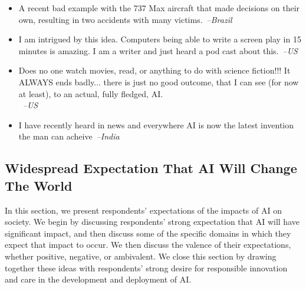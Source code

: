 \documentclass[sigconf]{acmart}
\newcommand\aff[1]{\textcolor{darkplum}{{\emph{--#1}}}}
\newenvironment{lq2}
{ \begin{itemize}[leftmargin = 2.0em, rightmargin=1.0em, label={}]
    \fontsize{8.3pt}{8.9pt}\selectfont
\setlength{\itemsep}{3pt}
    \setlength{\parskip}{3pt}
    \setlength{\parsep}{3pt}     }
{ \end{itemize}                  }
\begin{document}
\begin{lq2}
\item A recent bad example with the 737 Max aircraft that made decisions on their own, resulting in two accidents with many victims.~\aff{Brazil}
\item I am intrigued by this idea. Computers being able to write a screen play in 15 minutes is amazing. I am a writer and just heard a pod cast about this.~\aff{US}
\item Does no one watch movies, read, or anything to do with science fiction!!! It ALWAYS ends badly... there is just no good outcome, that I can see (for now at least), to an actual, fully fledged, AI.\\~\aff{US} 
\item I have recently heard in news and everywhere AI is now the latest invention the man can acheive~\aff{India} 
\end{lq2} 
    \subsection{Widespread Expectation That AI Will Change The World}

In this section, we present respondents' expectations of the impacts of AI on society. We begin by discussing respondents' strong expectation that AI will have significant impact, and then discuss some of the specific domains in which they expect that impact to occur. We then discuss the valence of their expectations, whether positive, negative, or ambivalent. We close this section by drawing together these ideas with respondents' strong desire for responsible innovation and care in the development and deployment of AI.
\end{document}
